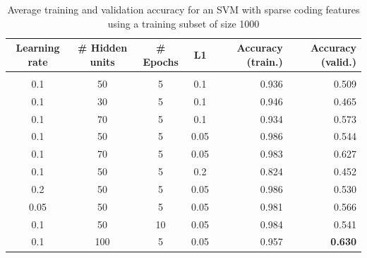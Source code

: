 \documentclass{article} %
\begin{document}
\begin{table}[h]
\caption{Average training and validation accuracy for an SVM with sparse coding features
 using a training subset of size 1000}
\label{results-table}
\begin{center}
\begin{adjustbox}{width=1\textwidth}
\begin{tabular}{cccc|rr}

\multicolumn{1}{c}{\bf Learning rate}  
&\multicolumn{1}{c}{\bf \# Hidden units}  
&\multicolumn{1}{c}{\bf \# Epochs} 
&\multicolumn{1}{c}{\bf L1} 
&\multicolumn{1}{|r}{\bf Accuracy (train.)}
&\multicolumn{1}{r}{\bf Accuracy (valid.)}
\\ \hline \\	
0.1 & 50 & 5 & 0.1 & 0.936 & 0.509 \\
0.1 & 30 & 5 & 0.1 & 0.946 & 0.465 \\
0.1 & 70 & 5 & 0.1 & 0.934 & 0.573 \\
0.1 & 50 & 5 & 0.05 & 0.986 & 0.544 \\
0.1 & 70 & 5 & 0.05 & 0.983 & 0.627 \\
0.1 & 50 & 5 & 0.2 & 0.824 & 0.452 \\
0.2 & 50 & 5 & 0.05 & 0.986 & 0.530 \\
0.05 & 50 & 5 & 0.05 & 0.981 & 0.566 \\
0.1 & 50 & 10 & 0.05 & 0.984 & 0.541 \\
0.1 & 100 & 5 & 0.05 & 0.957 & \textbf{0.630} \\

\end{tabular}
\end{adjustbox}
\end{center}
\end{table}
\end{document}
